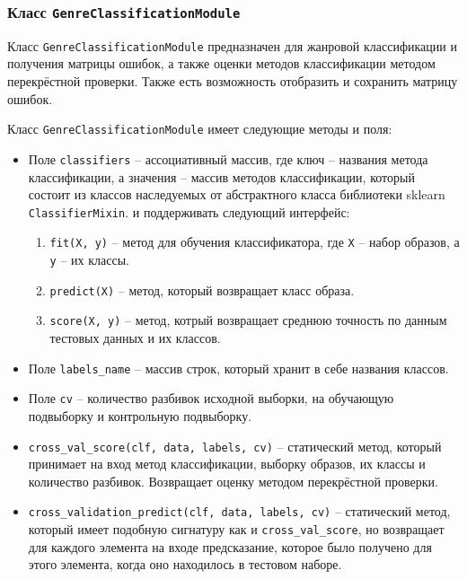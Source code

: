 \subsubsection{Класс \texttt{GenreClassificationModule}}

Класс \texttt{GenreClassificationModule} предназначен для жанровой классификации и получения матрицы ошибок, а также оценки методов классификации методом перекрёстной проверки. Также есть возможность отобразить и сохранить матрицу ошибок.


Класс \texttt{GenreClassificationModule} имеет следующие методы и поля:

\begin{itemize}
\item{Поле \texttt{classifiers} -- ассоциативный массив, где ключ -- названия метода классификации, а значения -- массив методов классификации, который состоит из классов наследуемых от абстрактного класса библиотеки sklearn \texttt{ClassifierMixin}. и поддерживать следующий интерфейс:}
\begin{enumerate}[label=\arabic*.]
\item \texttt{fit(X, y)} -- метод для обучения классификатора, где \texttt{X} -- набор образов, а \texttt{y} -- их классы.
\item \texttt{predict(X)} -- метод, который возвращает класс образа.
\item \texttt{score(X, y)} -- метод, котрый возвращает среднюю точность по данным тестовых данных и их классов.
\end{enumerate}
\item{Поле \texttt{labels\_name} -- массив строк, который хранит в себе названия классов. }
\item{Поле \texttt{cv} -- количество разбивок исходной выборки, на обучающую подвыборку и контрольную подвыборку.}

\item{\texttt{cross\_val\_score(clf, data, labels, cv)} -- статический метод, который принимает на вход метод классификации, выборку образов, их классы и количество разбивок. Возвращает оценку методом перекрёстной проверки.}
\item{\texttt{cross\_validation\_predict(clf, data, labels, cv)} -- статический метод, который имеет подобную сигнатуру как и \texttt{cross\_val\_score}, но возвращает для каждого элемента на входе предсказание, которое было получено для этого элемента, когда оно находилось в тестовом наборе. }


\end{itemize}

